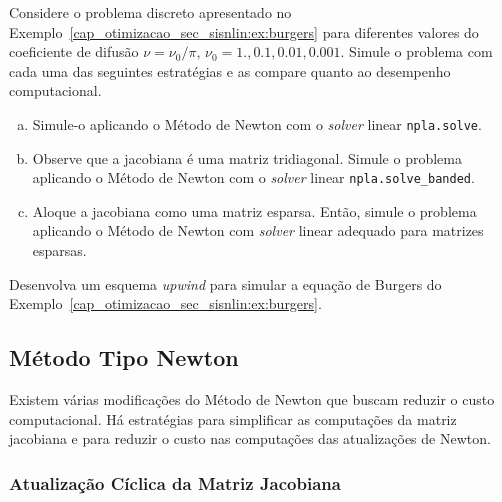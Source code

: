 \begin{exer}\label{cap_otimizacao_sec_sisnlin:exer:burgers}
  Considere o problema discreto apresentado no Exemplo~\ref{cap_otimizacao_sec_sisnlin:ex:burgers} para diferentes valores do coeficiente de difusão $\nu = \nu_0/\pi$, $\nu_0 = 1., 0.1, 0.01, 0.001$. Simule o problema com cada uma das seguintes estratégias e as compare quanto ao desempenho computacional.
  \begin{enumerate}[a)]
  \item Simule-o aplicando o Método de Newton com o {\it solver} linear \lstinline+npla.solve+.
  \item Observe que a jacobiana é uma matriz tridiagonal. Simule o problema aplicando o Método de Newton com o {\it solver} linear \lstinline+npla.solve_banded+.
  \item Aloque a jacobiana como uma matriz esparsa. Então, simule o problema aplicando o Método de Newton com {\it solver} linear adequado para matrizes esparsas.
  \end{enumerate}
\end{exer}

\begin{exer}
  Desenvolva um esquema \textit{upwind} para simular a equação de Burgers do Exemplo~\ref{cap_otimizacao_sec_sisnlin:ex:burgers}.
\end{exer}

\subsection{Método Tipo Newton}\label{cap_otimizacao_sec_sisnlin_ssec_tipoNewton}
\badgeRevisar

Existem várias modificações do Método de Newton{\newton} que buscam reduzir o custo computacional. Há estratégias para simplificar as computações da matriz jacobiana{\jacobi} e para reduzir o custo nas computações das atualizações de Newton.

\subsubsection{Atualização Cíclica da Matriz Jacobiana}
\badgeRevisar

